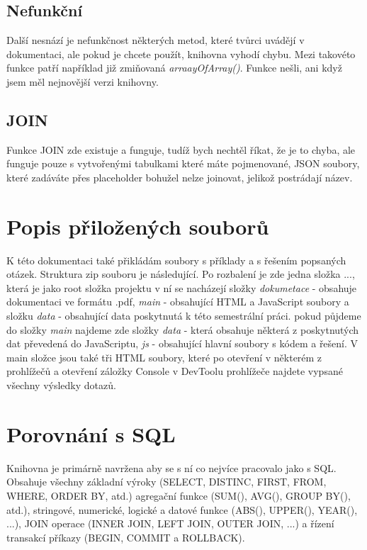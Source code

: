 \documentclass[a4, titlepage]{article}
\begin{document}
\subsection{Nefunkční}
Další nesnází je nefunkčnost některých metod, které tvůrci uvádějí v dokumentaci, ale pokud je chcete použít, knihovna vyhodí chybu. Mezi takovéto funkce patří například již zmiňovaná \textit{arraayOfArray()}.
Funkce nešli, ani když jsem měl nejnovější verzi knihovny.

\subsection{JOIN}
Funkce JOIN zde existuje a funguje, tudíž bych nechtěl říkat, že je to chyba, ale funguje pouze s vytvořenými tabulkami které máte pojmenované, JSON soubory, které zadáváte přes placeholder bohužel nelze joinovat, jelikož postrádají název.

\section{Popis přiložených souborů}
K této dokumentaci také přikládám soubory s příklady a s řešením popsaných otázek. Struktura zip souboru je následující. Po rozbalení je zde jedna složka ..., která je jako root složka projektu v ní se nacházejí složky \textit{dokumetace} - obsahuje dokumentaci ve formátu .pdf, \textit{main} - obsahující HTML a JavaScript soubory a složku \textit{data} - obsahující data poskytnutá k této semestrální práci. pokud půjdeme do složky \textit{main} najdeme zde složky  \textit{data} - která obsahuje některá z poskytnutých dat převedená do JavaScriptu, \textit{js} - obsahující hlavní soubory s kódem a řešení. V main složce jsou také tři HTML soubory, které po otevření v některém z prohlížečů a otevření záložky Console v DevToolu prohlížeče najdete vypsané všechny výsledky dotazů. 

\section{Porovnání s SQL}
Knihovna je primárně navržena aby se s ní co nejvíce pracovalo jako s SQL. Obsahuje všechny základní výroky (SELECT, DISTINC, FIRST, FROM, WHERE, ORDER BY, atd.) agregační funkce (SUM(), AVG(), GROUP BY(), atd.), stringové, numerické, logické a datové funkce (ABS(), UPPER(), YEAR(), ...), JOIN operace (INNER JOIN, LEFT JOIN, OUTER JOIN, ...) a řízení transakcí příkazy (BEGIN, COMMIT a ROLLBACK). 
\end{document}
